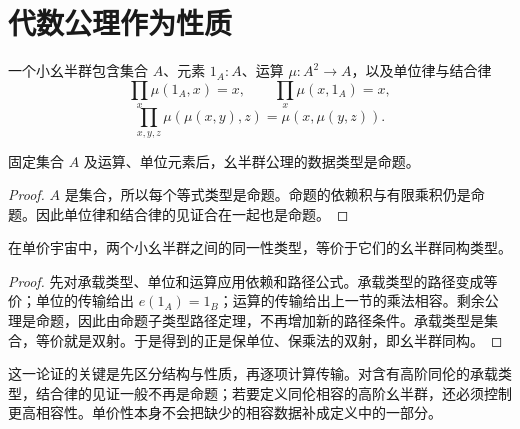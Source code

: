 \section{代数公理作为性质}
\begin{definition}[集合上的幺半群]
一个小幺半群包含集合 $A$、元素 $1_A:A$、运算 $\mu:A^2\to A$，以及单位律与结合律
\[
\prod_x\mu(1_A,x)=x,\qquad
\prod_x\mu(x,1_A)=x,
\]
\[
\prod_{x,y,z}\mu(\mu(x,y),z)=\mu(x,\mu(y,z)).
\]
\end{definition}
\begin{lemma}
固定集合 $A$ 及运算、单位元素后，幺半群公理的数据类型是命题。
\end{lemma}
\begin{proof}
$A$ 是集合，所以每个等式类型是命题。命题的依赖积与有限乘积仍是命题。因此单位律和结合律的见证合在一起也是命题。
\end{proof}
\begin{theorem}[幺半群的结构同一性]
在单价宇宙中，两个小幺半群之间的同一性类型，等价于它们的幺半群同构类型。
\end{theorem}
\begin{proof}
先对承载类型、单位和运算应用依赖和路径公式。承载类型的路径变成等价；单位的传输给出 $e(1_A)=1_B$；运算的传输给出上一节的乘法相容。剩余公理是命题，因此由命题子类型路径定理，不再增加新的路径条件。承载类型是集合，等价就是双射。于是得到的正是保单位、保乘法的双射，即幺半群同构。
\end{proof}
\begin{remark}
这一论证的关键是先区分结构与性质，再逐项计算传输。对含有高阶同伦的承载类型，结合律的见证一般不再是命题；若要定义同伦相容的高阶幺半群，还必须控制更高相容性。单价性本身不会把缺少的相容数据补成定义中的一部分。
\end{remark}
